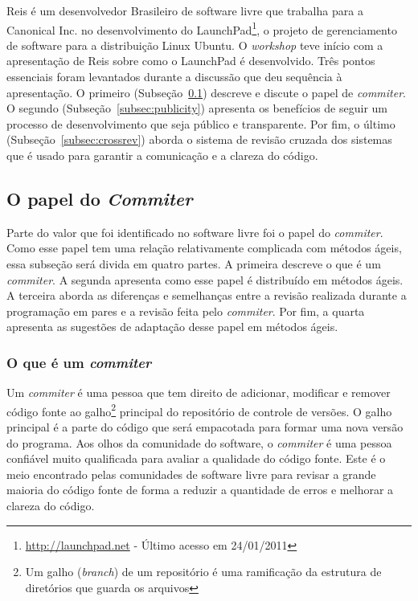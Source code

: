 Reis é um desenvolvedor Brasileiro de software livre que trabalha para
a Canonical Inc. no desenvolvimento do
LaunchPad\footnote{\url{http://launchpad.net} - Último acesso em
  24/01/2011}, o projeto de gerenciamento de software para a
distribuição Linux Ubuntu. O \emph{workshop} teve início com a
apresentação de Reis sobre como o LaunchPad é desenvolvido. Três
pontos essenciais foram levantados durante a discussão que deu
sequência à apresentação. O primeiro (Subseção~\ref{subsec:commiter})
descreve e discute o papel de \emph{commiter}.  O segundo
(Subseção~\ref{subsec:publicity}) apresenta os benefícios de seguir um
processo de desenvolvimento que seja público e transparente.  Por fim,
o último (Subseção~\ref{subsec:crossrev}) aborda o sistema de revisão
cruzada dos sistemas que é usado para garantir a comunicação e a
clareza do código.

\subsection{O papel do \emph{Commiter}}
\label{subsec:commiter}

Parte do valor que foi identificado no software livre foi o papel do
\emph{commiter}. Como esse papel tem uma relação relativamente
complicada com métodos ágeis, essa subseção será divida em quatro
partes. A primeira descreve o que é um \emph{commiter}. A segunda
apresenta como esse papel é distribuído em métodos ágeis. A terceira
aborda as diferenças e semelhanças entre a revisão realizada durante a
programação em pares e a revisão feita pelo \emph{commiter}. Por fim,
a quarta apresenta as sugestões de adaptação desse papel em métodos
ágeis.

\subsubsection{O que é um \emph{commiter}}

Um \emph{commiter} é uma pessoa que tem direito de adicionar,
modificar e remover código fonte ao galho\footnote{Um galho
  (\emph{branch}) de um repositório é uma ramificação da estrutura de
  diretórios que guarda os arquivos} principal do repositório de
controle de versões. O galho principal é a parte do código que será
empacotada para formar uma nova versão do programa. Aos olhos da
comunidade do software, o \emph{commiter} é uma pessoa confiável muito
qualificada para avaliar a qualidade do código fonte. Este é o meio
encontrado pelas comunidades de software livre para revisar a grande
maioria do código fonte de forma a reduzir a quantidade de erros e
melhorar a clareza do código.

